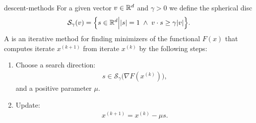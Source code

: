 \begin{Definition}{descent-methods}
  For a given vector $v \in \mathbb R^d$ and $\gamma > 0$ we define the
  spherical disc
    \begin{gather}
    \label{eq:descent-methods:1}
    \mathcal S_\gamma(v) = \Bigl\{s\in \mathbb R^d \Big|
    \lvert s\rvert = 1 \;\wedge \;
    v\cdot s \ge \gamma \lvert v\rvert \Bigr\}.
  \end{gather}
  A  is an iterative method for finding
  minimizers of the functional $F(x)$ that computes iterate $x^{(k+1)}$
  from iterate $x^{(k)}$ by the following steps:
  \begin{enumerate}
  \item Choose a search direction:
    \begin{gather*}
      s \in \mathcal S_\gamma\bigl(\nabla F(x^{(k)})\bigr),
    \end{gather*}
    and a positive parameter $\mu$.
  \item Update:
    \begin{gather*}
      x^{(k+1)} = x^{(k)} -\mu s.
    \end{gather*}
  \end{enumerate}
\end{Definition}
